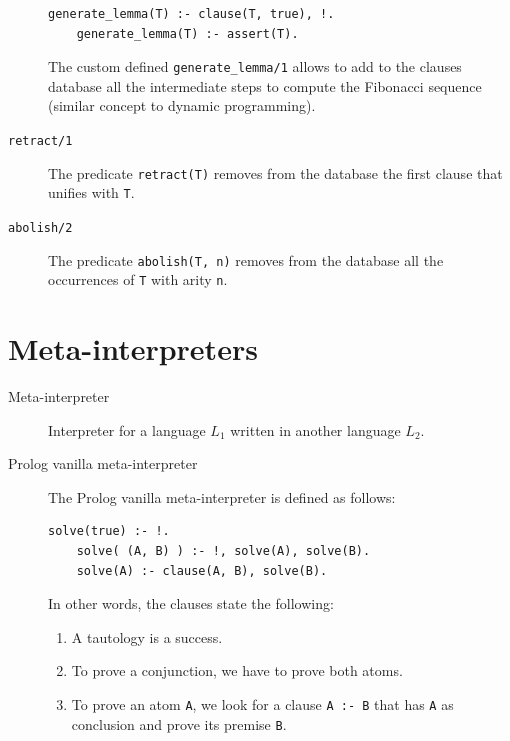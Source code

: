 \begin{description}
\begin{example}
\begin{lstlisting}[language={}]
    generate_lemma(T) :- clause(T, true), !.
    generate_lemma(T) :- assert(T).
            \end{lstlisting} 

            The custom defined \texttt{generate\_lemma/1} allows to add to the clauses database all the intermediate steps to compute the Fibonacci sequence
            (similar concept to dynamic programming).
        \end{example}

    \item[\texttt{retract/1}] 
        The predicate \texttt{retract(T)} removes from the database the first clause that unifies with \texttt{T}.

    \item[\texttt{abolish/2}] 
        The predicate \texttt{abolish(T, n)} removes from the database all the occurrences of \texttt{T} with arity \texttt{n}.
\end{description}



\section{Meta-interpreters}

\begin{description}
    \item[Meta-interpreter] 
        Interpreter for a language $L_1$ written in another language $L_2$.

    \item[Prolog vanilla meta-interpreter] 
        The Prolog vanilla meta-interpreter is defined as follows:
        \begin{lstlisting}[language={}]
    solve(true) :- !.
    solve( (A, B) ) :- !, solve(A), solve(B).
    solve(A) :- clause(A, B), solve(B).
        \end{lstlisting}

        In other words, the clauses state the following:
        \begin{enumerate}
            \item A tautology is a success.
            \item To prove a conjunction, we have to prove both atoms.
            \item To prove an atom \texttt{A}, 
                we look for a clause \texttt{A :- B} that has \texttt{A} as conclusion and prove its premise \texttt{B}.
        \end{enumerate}
\end{description}
